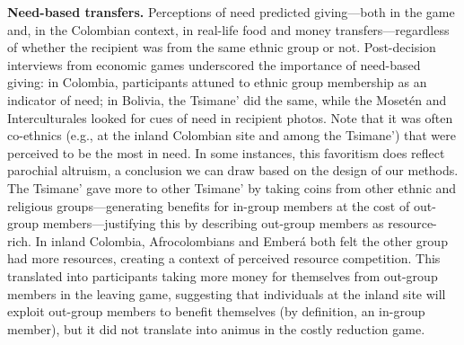 \documentclass[bibauthoryear]{aa}
\begin{document}
\textbf{Need-based transfers.} Perceptions of need predicted giving---both in the game and, in the Colombian context, in real-life food and money transfers---regardless of whether the recipient was from the same ethnic group or not. Post-decision interviews from economic games underscored the importance of need-based giving: in Colombia, participants attuned to ethnic group membership as an indicator of need; in Bolivia, the Tsimane' did the same, while the Moset\'en and Interculturales looked for cues of need in recipient photos. Note that it was often co-ethnics (e.g., at the inland Colombian site and among the Tsimane') that were perceived to be the most in need. In some instances, this favoritism does reflect parochial altruism, a conclusion we can draw based on the design of our methods. The Tsimane' gave more to other Tsimane' by taking coins from other ethnic and religious groups---generating benefits for in-group members at the cost of out-group members---justifying this by describing out-group members as resource-rich. In inland Colombia, Afrocolombians and Ember\'a both felt the other group had more resources, creating a context of perceived resource competition. This translated into participants taking more money for themselves from out-group members in the leaving game, suggesting that individuals at the inland site will exploit out-group members to benefit themselves (by definition, an in-group member), but it did not translate into animus in the costly reduction game.
\end{document}
